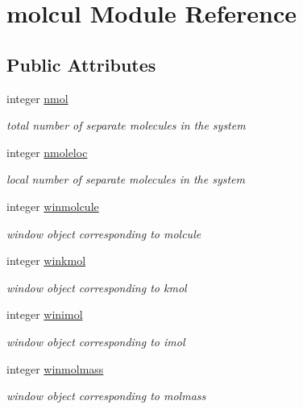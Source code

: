 \hypertarget{classmolcul}{\section{molcul Module Reference}
\label{classmolcul}
}
\subsection*{Public Attributes}
\begin{DoxyCompactItemize}
\item 
integer \hyperlink{classmolcul_a56c256c5f7cdbf7b7a267b5003c776ec}{nmol}
\begin{DoxyCompactList}\small\item\em total number of separate molecules in the system \end{DoxyCompactList}\item 
integer \hyperlink{classmolcul_a7f367e6c4c29a8349ee56c6a9a57f627}{nmoleloc}
\begin{DoxyCompactList}\small\item\em local number of separate molecules in the system \end{DoxyCompactList}\item 
integer \hyperlink{classmolcul_a9d2b904765f02dba80da18d3649983d8}{winmolcule}
\begin{DoxyCompactList}\small\item\em window object corresponding to molcule \end{DoxyCompactList}\item 
integer \hyperlink{classmolcul_a3d4317cc7eda6c46c437b0a7ebf01903}{winkmol}
\begin{DoxyCompactList}\small\item\em window object corresponding to kmol \end{DoxyCompactList}\item 
integer \hyperlink{classmolcul_a7f2c0c497b9a26ac237be07ca2b484f7}{winimol}
\begin{DoxyCompactList}\small\item\em window object corresponding to imol \end{DoxyCompactList}\item 
integer \hyperlink{classmolcul_a9a1c4cd5046394b3cadb077ff1eb2469}{winmolmass}
\begin{DoxyCompactList}\small\item\em window object corresponding to molmass \end{DoxyCompactList}\item 

\end{DoxyCompactItemize}
